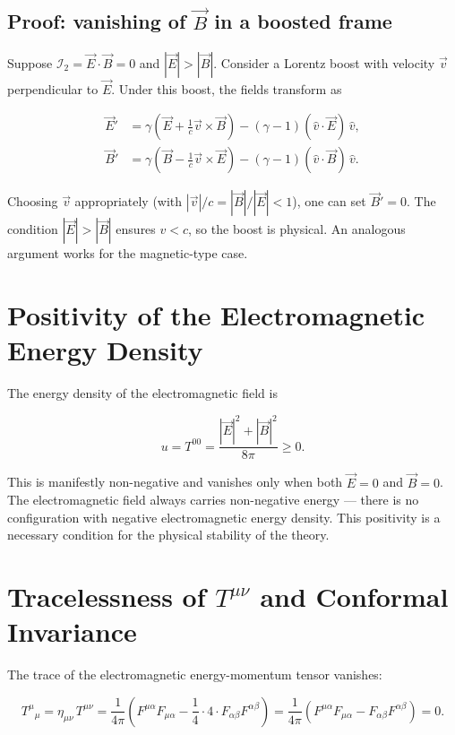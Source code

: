 \subsection{Proof: vanishing of $\vec{B}$ in a boosted frame}

Suppose $\mathcal{I}_2 = \vec{E}\cdot\vec{B} = 0$ and $|\vec{E}| > |\vec{B}|$. Consider a Lorentz boost with velocity $\vec{v}$ perpendicular to $\vec{E}$. Under this boost, the fields transform as

\begin{align}
\vec{E}' &= \gamma(\vec{E} + \tfrac{1}{c}\vec{v}\times\vec{B}) - (\gamma - 1)(\hat{v}\cdot\vec{E})\,\hat{v}, \\
\vec{B}' &= \gamma(\vec{B} - \tfrac{1}{c}\vec{v}\times\vec{E}) - (\gamma - 1)(\hat{v}\cdot\vec{B})\,\hat{v}.
\end{align}

Choosing $\vec{v}$ appropriately (with $|\vec{v}|/c = |\vec{B}|/|\vec{E}| < 1$), one can set $\vec{B}' = 0$. The condition $|\vec{E}| > |\vec{B}|$ ensures $v < c$, so the boost is physical. An analogous argument works for the magnetic-type case.

\section{Positivity of the Electromagnetic Energy Density}

The energy density of the electromagnetic field is

\begin{equation}
u = T^{00} = \frac{|\vec{E}|^2 + |\vec{B}|^2}{8\pi} \geq 0.
\end{equation}

This is manifestly non-negative and vanishes only when both $\vec{E} = 0$ and $\vec{B} = 0$. The electromagnetic field always carries non-negative energy --- there is no configuration with negative electromagnetic energy density. This positivity is a necessary condition for the physical stability of the theory.

\section{Tracelessness of $T^{\mu\nu}$ and Conformal Invariance}

The trace of the electromagnetic energy-momentum tensor vanishes:

\begin{equation}
T^\mu{}_\mu = \eta_{\mu\nu}\,T^{\mu\nu} = \frac{1}{4\pi}\!\left(F^{\mu\alpha}F_{\mu\alpha} - \frac{1}{4}\cdot 4\cdot F_{\alpha\beta}F^{\alpha\beta}\right) = \frac{1}{4\pi}(F^{\mu\alpha}F_{\mu\alpha} - F_{\alpha\beta}F^{\alpha\beta}) = 0.
\end{equation}

